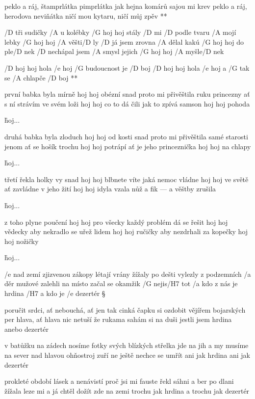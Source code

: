 \R peklo a ráj, štamprlátka pimprlátka
   jak hejna komárů sajou mi krev
   peklo a ráj, herodova neviňátka
   ničí mou kytaru, ničí můj zpěv **




/D tři sudičky /A u kolébky /G hoj hoj stály /D mi
/D podle tvaru /A mojí lebky /G hoj hoj /A věšti/D ly
/D já jsem zrovna /A dělal kakú /G hoj hoj do ple/D nek
/D nechápal jsem /A smysl jejich /G hoj hoj /A myšle/D nek

\R /D hoj hoj hola /e hoj /G budoucnost je /D boj
   /D hoj hoj hola /e hoj a /G tak se /A chlapče /D boj **

první babka byla mírně hoj hoj obézní
snad proto mi přivěštila ruku princezny
ať s ní strávím ve svém loži hoj hoj co to dá
čili jak to zpívá samson hoj hoj pohoda

\r hoj...

druhá babka byla zloduch hoj hoj od kosti
snad proto mi přivěštila samé starosti
jenom ať se hošík trochu hoj hoj potrápí
ať je jeho princeznička hoj hoj na chlapy

\r hoj...

třetí řekla holky vy snad hoj hoj blbnete
víte jaká nemoc vládne hoj hoj ve světě
ať zavládne v jeho žití hoj hoj idyla
vzala nůž a fik --- a věštby zrušila

\r hoj...

z toho plyne poučení hoj hoj pro všecky
každý problém dá se řešit hoj hoj vědecky
aby nekradlo se uřež lidem hoj hoj ručičky
aby nezdrhali za kopečky hoj hoj nožičky

\r hoj...




/e nad zemí zjizvenou zákopy létají vrány
žížaly po dešti vylezly z podzemních /a děr
mužové zalehli na místo
začal se okamžik /G nejis/H7 tot
/a kdo z nás je hrdina /H7 a kdo je /e dezertér \S

poručit srdci, ať nebouchá, ať jen tak cinká
čapku si ozdobit vějířem bojarských per
hlava, ať hlava nic netuší
že rukama sahám si na duši
jestli jsem hrdina anebo dezertér \s

v batůžku na zádech nosíme fotky svých blízkých
střelka jde na jih a my musíme na sever
nad hlavou ohňostroj zuří
ne ještě nechce se umřít
ani jak hrdina ani jak dezertér \s

prokleté období lásek a nenávistí
proč jsi mi fauste řekl sáhni a ber
po dlani žížala leze mi
a já chtěl dožít zde na zemi
trochu jak hrdina a trochu jak dezertér \s

